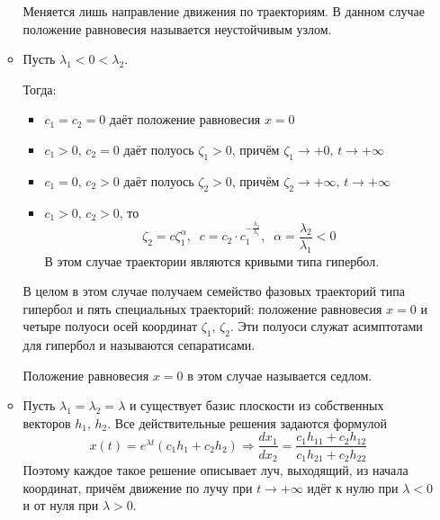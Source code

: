 \documentclass[a4paper,12pt]{article}
\theoremstyle{plain}
\theoremstyle{definition}
\theoremstyle{remark}
\begin{document}
\begin{enumerate}
\begin{itemize}
		            Меняется лишь направление движения по траекториям. В данном случае положение равновесия называется неустойчивым узлом.
		      \item Пусть $\lambda_1 < 0 < \lambda_2$.

		            Тогда:
		            \begin{itemize}
			            \item $c_1 = c_2 = 0$ даёт положение равновесия $x = 0$
			            \item $c_1 > 0,\, c_2 = 0$ даёт полуось $\zeta_1 > 0$, причём $\zeta_1 \to +0,\, t \to +\infty$
			            \item $c_1 = 0,\, c_2 > 0$ даёт полуось $\zeta_2 > 0$, причём $\zeta_2 \to +\infty,\, t \to +\infty$
			            \item $c_1 > 0,\, c_2 > 0$, то
			                  \[\zeta_2 = c\zeta_1^\alpha,\;\; c = c_2 \cdot c_1^{-\frac{\lambda_2}{\lambda_1}},\;\; \alpha = \frac{\lambda_2}{\lambda_1} < 0\]
			                  В этом случае траектории являются кривыми типа гипербол.
		            \end{itemize}
		            В целом в этом случае получаем семейство фазовых траекторий типа гипербол и пять специальных траекторий: положение равновесия $x = 0$ и четыре полуоси осей координат $\zeta_1,\, \zeta_2$. Эти полуоси служат асимптотами для гипербол и называются сепаратисами.

		            Положение равновесия $x = 0$ в этом случае называется седлом.
		      \item Пусть $\lambda_1 = \lambda_2 = \lambda$ и существует базис плоскости из собственных векторов $h_1,\,h_2$. Все действительные решения задаются формулой
		            \[x(t) = e^{\lambda t}(c_1h_1 + c_2h_2) \Rightarrow \frac{dx_1}{dx_2} = \frac{c_1h_{11} + c_2h_{12}}{c_1h_{21} + c_2h_{22}}\]
		            Поэтому каждое такое решение описывает луч, выходящий, из начала координат, причём движение по лучу при $t \to +\infty$ идёт к нулю при $\lambda < 0$ и от нуля при $\lambda > 0$.


\end{itemize}
\end{enumerate}
\end{document}
